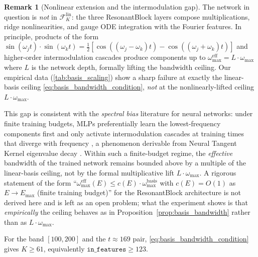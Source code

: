 \documentclass[11pt, a4paper]{article}
\theoremstyle{definition}
\newtheorem{remark}{Remark}[section]
\theoremstyle{plain}
\begin{document}
\begin{remark}[Nonlinear extension and the intermodulation
gap]\label{rem:intermodulation_gap}
The network in question is \emph{not} in
$\mathcal{F}_K^{\mathrm{lin}}$: the three ResonantBlock layers
compose multiplications, ridge nonlinearities, and gauge ODE
integration with the Fourier features. In principle, products
of the form $\sin(\omega_j t)\cdot\sin(\omega_k t)=
\tfrac{1}{2}[\cos((\omega_j-\omega_k)t)-
\cos((\omega_j+\omega_k)t)]$ and higher-order intermodulation
cascades produce components up to
$\omega^{\mathrm{eff}}_{\max}=L\cdot\omega_{\max}$ where $L$
is the network depth, formally lifting the bandwidth ceiling.
Our empirical data (\cref{tab:basis_scaling}) show a sharp
failure at exactly the linear-basis ceiling
\eqref{eq:basis_bandwidth_condition}, \emph{not} at the
nonlinearly-lifted ceiling $L\cdot\omega_{\max}$.

This gap is consistent with the \emph{spectral bias} literature
for neural networks: under finite training budgets, MLPs
preferentially learn the lowest-frequency components first and
only activate intermodulation cascades at training times that
diverge with frequency \cite{Rahaman2019SpectralBias,
BasriGeifman2020FrequencyBias}, a phenomenon derivable from
Neural Tangent Kernel eigenvalue decay
\cite{Jacot2018NTK}. Within such a finite-budget regime, the
\emph{effective} bandwidth of the trained network remains
bounded above by a multiple of the linear-basis ceiling, not
by the formal multiplicative lift $L\cdot\omega_{\max}$.
A rigorous statement of the form
``$\omega^{\mathrm{eff}}_{\max}(E)\leq c(E)\cdot
\omega^{\mathrm{basis}}_{\max}$ with $c(E)=O(1)$ as
$E\to E_{\max}$ (finite training budget)'' for the
ResonantBlock architecture is not derived here and is left as
an open problem; what the experiment shows is that
\emph{empirically} the ceiling behaves as in
Proposition~\ref{prop:basis_bandwidth} rather than as
$L\cdot\omega_{\max}$.
\end{remark}

For the band $[100,200]$ and the $t\approx 169$ pair,
\eqref{eq:basis_bandwidth_condition} gives $K\geq 61$,
equivalently $\texttt{in\_features}\geq 123$.
\end{document}
